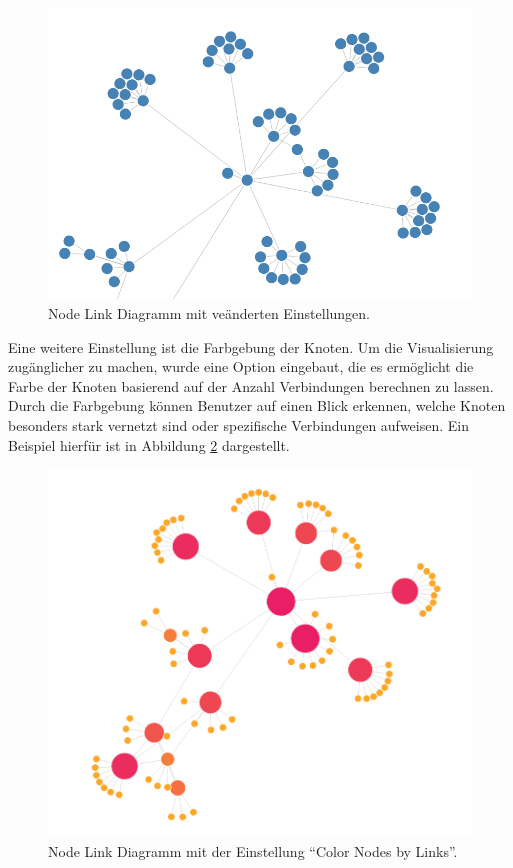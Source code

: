 \begin{figure}[h]
    \centering
    \includegraphics[height=.5\textwidth]{images/03/NodeLinkChangedSettings.png}
    \caption{Node Link Diagramm mit veänderten Einstellungen.}
    \label{fig:realization:implementation:NodeLinkWithChangedSettings}
\end{figure}

Eine weitere Einstellung ist die Farbgebung der Knoten. Um die Visualisierung zugänglicher zu machen, wurde eine Option eingebaut, die es ermöglicht die Farbe der Knoten basierend auf der Anzahl Verbindungen berechnen zu lassen. Durch die Farbgebung können Benutzer auf einen Blick erkennen, welche Knoten besonders stark vernetzt sind oder spezifische Verbindungen aufweisen. Ein Beispiel hierfür ist in Abbildung \ref{fig:realization:implementation:ColorNodesByLinks} dargestellt.

\begin{figure}[h]
    \centering
    \includegraphics[height=.5\textwidth]{images/03/ColorNodesByLinks.png}
    \caption{Node Link Diagramm mit der Einstellung \enquote{Color Nodes by Links}.}
    \label{fig:realization:implementation:ColorNodesByLinks}
\end{figure}

